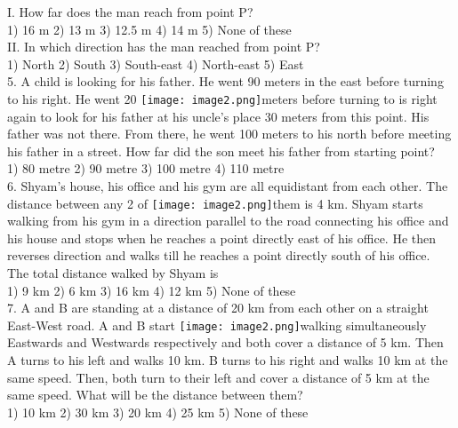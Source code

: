 \documentclass[
]{article}
\begin{document}
I. How far does the man reach from point P?\\
1) 16 m \hspace{2mm}2) 13 m \hspace{2mm}3) 12.5 m \hspace{2mm}4) 14 m \hspace{2mm}5) None of these\\

II. In which direction has the man reached from point P?\\
1) North \hspace{2mm}2) South \hspace{2mm}3) South-east \hspace{2mm}4) North-east \hspace{2mm}5) East\\

5. A child is looking for his father. He went 90 meters in the east before turning to his right. He went 20 \texttt{[image: image2.png]}meters before turning to is right again to look for his father at his uncle's place 30 meters from this point. His father was not there. From there, he went 100 meters to his north before meeting his father in a street. How far did the son meet his father from starting
point?\\
1) 80 metre \hspace{2mm}2) 90 metre \hspace{2mm}3) 100 metre \hspace{2mm}4) 110 metre\\

6. Shyam’s house, his office and his gym are all equidistant from each other. The distance between any 2 of \texttt{[image: image2.png]}them is 4 km. Shyam starts walking from his gym in a direction parallel to the road connecting his office and his house and stops when he reaches a point directly east
of his office. He then reverses direction and walks till he reaches a point directly south of his office. The total distance walked by Shyam is\\
1) 9 km \hspace{2mm}2) 6 km \hspace{2mm}3) 16 km \hspace{2mm}4) 12 km \hspace{2mm}5) None of these\\

7. A and B are standing at a distance of 20 km from each other on a straight East-West road. A and B start \texttt{[image: image2.png]}walking simultaneously Eastwards and Westwards respectively and both cover a distance of 5 km. Then A turns to his left and walks 10 km. B turns to his right and walks
10 km at the same speed. Then, both turn to their left and cover a distance of 5 km at the same speed. What will be the distance between them?\\
1) 10 km \hspace{2mm}2) 30 km \hspace{2mm}3) 20 km \hspace{2mm}4) 25 km \hspace{2mm}5) None of these\\
\end{document}
